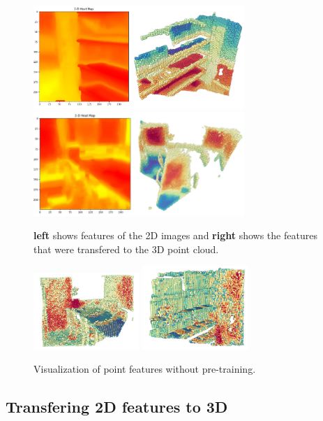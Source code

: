 \documentclass[10pt,twocolumn,letterpaper]{article}
\begin{document}
\begin{figure}
    \centering
    \includegraphics[width=8cm]{images/experiments/image-to-point-vis1.png}
    \includegraphics[width=8cm]{images/experiments/image-to-point-vis2.png}
    \caption{\textbf{left} shows features of the 2D images and \textbf{right} shows the features that were transfered to the 3D point cloud.}
    \label{fig:features2d-3dvis}
\end{figure}

\begin{figure}
    \centering
    \includegraphics[width=4cm]{images/experiments/scratch-3d.png}
    \includegraphics[width=4cm]{images/experiments/scratch-3d-2.png}
    \caption{Visualization of point features without pre-training.}
    \label{fig:features2dScratchvis}
\end{figure}

\subsection{Transfering 2D features to 3D}
\label{sec:results:2d3d}
\end{document}
